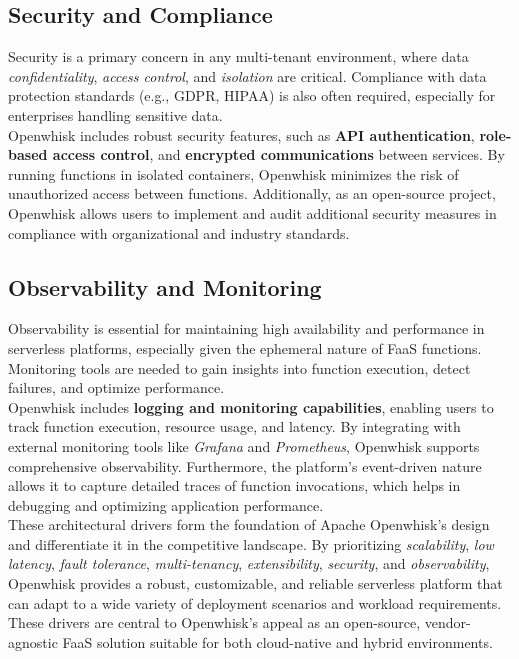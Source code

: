 \subsection{Security and Compliance}
Security is a primary concern in any multi-tenant environment, where data \textit{confidentiality}, \textit{access control}, and \textit{isolation} are critical. Compliance with data protection standards (e.g., GDPR, HIPAA) is also often required, especially for enterprises handling sensitive data.\vspace{14pt}\\
Openwhisk includes robust security features, such as \textbf{API authentication}, \textbf{role-based access control}, and \textbf{encrypted communications} between services. By running functions in isolated containers, Openwhisk minimizes the risk of unauthorized access between functions. Additionally, as an open-source project, Openwhisk allows users to implement and audit additional security measures in compliance with organizational and industry standards.
\subsection{Observability and Monitoring}
Observability is essential for maintaining high availability and performance in serverless platforms, especially given the ephemeral nature of FaaS functions. Monitoring tools are needed to gain insights into function execution, detect failures, and optimize performance.\vspace{14pt}\\
Openwhisk includes \textbf{logging and monitoring capabilities}, enabling users to track function execution, resource usage, and latency. By integrating with external monitoring tools like \textit{Grafana} and \textit{Prometheus}, Openwhisk supports comprehensive observability. Furthermore, the platform’s event-driven nature allows it to capture detailed traces of function invocations, which helps in debugging and optimizing application performance.
\vspace{20pt}\\
These architectural drivers form the foundation of Apache Openwhisk’s design and differentiate it in the competitive landscape. By prioritizing \textit{scalability}, \textit{low latency}, \textit{fault tolerance}, \textit{multi-tenancy}, \textit{extensibility}, \textit{security}, and \textit{observability}, Openwhisk provides a robust, customizable, and reliable serverless platform that can adapt to a wide variety of deployment scenarios and workload requirements.\vspace{14pt}\\
These drivers are central to Openwhisk’s appeal as an open-source, vendor-agnostic FaaS solution suitable for both cloud-native and hybrid environments.